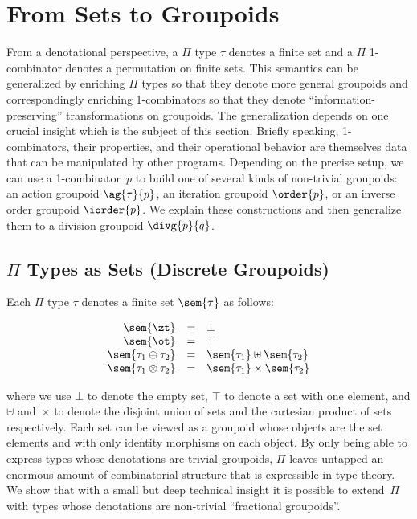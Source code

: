 \section{From Sets to Groupoids}
\label{sec:groupoids}

From a denotational perspective, a $\Pi$ type $\tau$ denotes a finite set and a
$\Pi$ 1-combinator denotes a permutation on finite sets. This semantics can be
generalized by enriching $\Pi$ types so that they denote more general groupoids
and correspondingly enriching 1-combinators so that they denote
``information-preserving'' transformations on groupoids. The generalization
depends on one crucial insight which is the subject of this section. Briefly
speaking, 1-combinators, their properties, and their operational behavior are
themselves data that can be manipulated by other programs. Depending on the
precise setup, we can use a 1-combinator~$p$ to build one of several kinds of
non-trivial groupoids: an action groupoid $\ag{\tau}{p}$, an iteration groupoid
$\order{p}$, or an inverse order groupoid $\iorder{p}$. We explain these
constructions and then generalize them to a division groupoid $\divg{p}{q}$.

\subsection{$\Pi$ Types as Sets (Discrete Groupoids)}

Each $\Pi$ type $\tau$ denotes a finite set $\sem{\tau}$ as follows:

\[\begin{array}{rcl}
\sem{\zt} &=& \bot \\
\sem{\ot} &=& \top \\
\sem{\tau_1 \oplus \tau_2} &=& \sem{\tau_1} \uplus \sem{\tau_2} \\
\sem{\tau_1 \otimes \tau_2} &=& \sem{\tau_1} \times \sem{\tau_2}
\end{array}\]

\noindent where we use $\bot$ to denote the empty set, $\top$ to denote a set
with one element, and $\uplus$ and~$\times$ to denote the disjoint union of sets
and the cartesian product of sets respectively. Each set can be viewed as a
groupoid whose objects are the set elements and with only identity morphisms on
each object. By only being able to express types whose denotations are trivial
groupoids, $\Pi$ leaves untapped an enormous amount of combinatorial structure
that is expressible in type theory. We show that with a small but deep technical
insight it is possible to extend~$\Pi$ with types whose denotations are
non-trivial ``fractional groupoids''.

